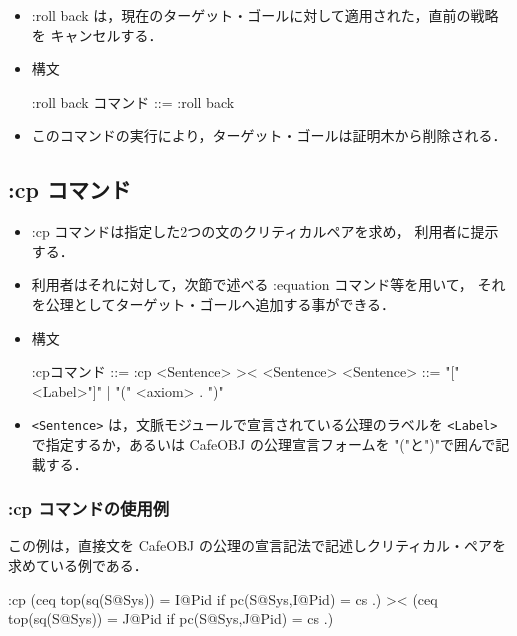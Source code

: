 \documentclass[a4paper,oneside,10pt,here]{memoir}
\newenvironment{vvtm}%
{\parskip=0pt\lineskip=0pt\begin{center}\begin{minipage}{0.8\textwidth}\begin{snugshade}}%
  {\end{snugshade}\end{minipage}\end{center}}
\begin{document}
\begin{itemize}
\item :roll back は，現在のターゲット・ゴールに対して適用された，直前の戦略を
  キャンセルする．
\item 構文
  \begin{vvtm}
    \begin{simplev}
      :roll back コマンド ::= :roll back
    \end{simplev}
  \end{vvtm}
\item このコマンドの実行により，ターゲット・ゴールは証明木から削除される．
\end{itemize}

\subsection{:cp コマンド}

\begin{itemize}
\item :cp コマンドは指定した2つの文のクリティカルペアを求め，
  利用者に提示する．
\item 利用者はそれに対して，次節で述べる :equation コマンド等を用いて，
  それを公理としてターゲット・ゴールへ追加する事ができる．
\item 構文
  \begin{vvtm}
    \begin{simplev}
      :cpコマンド ::= :cp <Sentence> >< <Sentence>
      <Sentence>  ::= "["<Label>"]" | "(" <axiom> . ")"
    \end{simplev}
  \end{vvtm}
\item \verb|<Sentence>| は，文脈モジュールで宣言されている公理のラベルを
  \verb|<Label>| で指定するか，あるいは CafeOBJ の公理宣言フォームを
  "("と")"で囲んで記載する．
\end{itemize}

\subsubsection{:cp コマンドの使用例}
この例は，直接文を CafeOBJ の公理の宣言記法で記述しクリティカル・ペアを
求めている例である．
\begin{vvtm}
  \begin{simplev}
:cp (ceq top(sq(S@Sys)) = I@Pid if pc(S@Sys,I@Pid) = cs .) 
    >< 
    (ceq top(sq(S@Sys)) = J@Pid if pc(S@Sys,J@Pid) = cs .)
  \end{simplev}
\end{vvtm}
\end{document}
